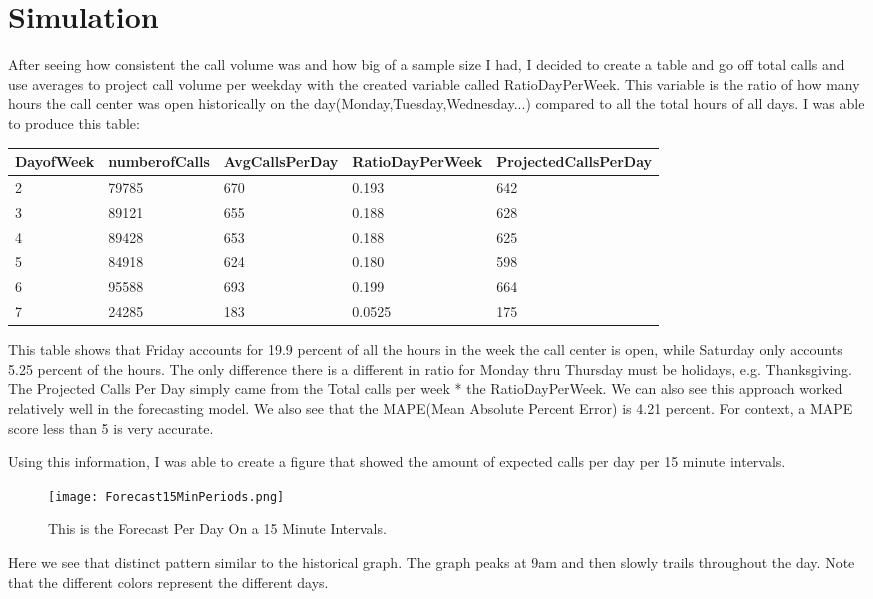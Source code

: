 \documentclass[12pt]{article}
\begin{document}
\section*{Simulation}
After seeing how consistent the call volume was and how big of a sample size I had, I decided to create a table and go off total calls and use averages to project call volume per weekday with the 
created variable called RatioDayPerWeek. This variable is the ratio of how many hours the call center was open historically on the day(Monday,Tuesday,Wednesday...) compared to all the total hours of all days.
I was able to produce this table:
\begin{table}[H]
  \resizebox{\textwidth}{!} {
  \begin{tabular}{ l | l | l | l | l |}
    {\bf DayofWeek} & {\bf numberofCalls} & {\bf AvgCallsPerDay} & {\bf RatioDayPerWeek} & {\bf ProjectedCallsPerDay} \\
  \hline
  2 & 79785 & 670 & 0.193 & 642 \\
  \hline
  3 & 89121 & 655 & 0.188 & 628 \\
  \hline
  4 & 89428 & 653 & 0.188 & 625 \\
  \hline
  5 & 84918 & 624 & 0.180 & 598 \\
  \hline
  6 & 95588 & 693 & 0.199 & 664 \\
  \hline
  7 & 24285 & 183 & 0.0525 & 175\\
  \end{tabular}
  }
  \end{table}
This table shows that Friday accounts for 19.9 percent of all the hours in the week the call center is open, while Saturday only accounts
5.25 percent of the hours. The only difference there is a different in ratio for Monday thru Thursday must be holidays, e.g. Thanksgiving. 
The Projected Calls Per Day simply came from the Total calls per week * the RatioDayPerWeek. We can also see this approach worked relatively well in the forecasting model. 
We also see that the MAPE(Mean Absolute Percent Error) is 4.21 percent. For context, a MAPE score less than 5 is very accurate.

  Using this information, I was able to create a figure that showed the amount of expected calls per day per 15 minute intervals. 
  \begin{figure}[H]
    \centering
    \texttt{[image: Forecast15MinPeriods.png]}
    \caption{This is the Forecast Per Day On a 15 Minute Intervals.}
    \label{fig:Forecast}
  \end{figure}
Here we see that distinct pattern similar to the historical graph. The graph peaks at 9am and then slowly trails throughout the day.
Note that the different colors represent the different days.
\end{document}
